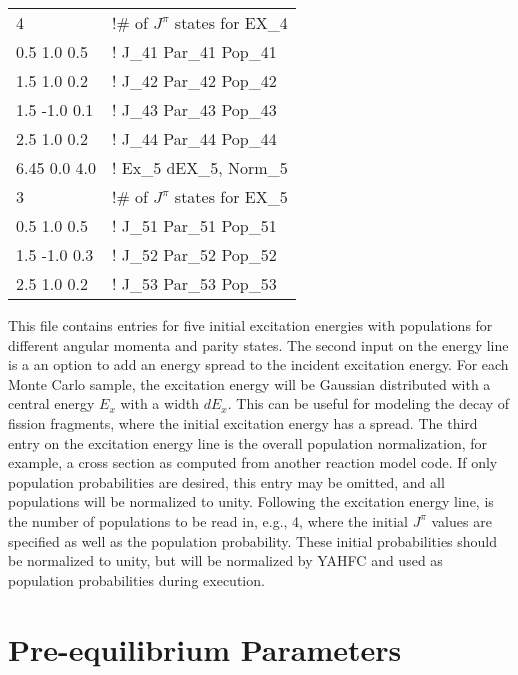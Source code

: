 \documentclass[
10pt,
showpacs,preprintnumbers,footinbib,
amsfonts,amsmath,amssymb,
aps,
prc,twocolumn,groupedaddress,superscriptaddress,
showkeys,
nofootinbib
]{revtex4-1}
\begin{document}
\begin{center}
\begin{tabular}{| p{3 cm} p{5 cm}|}
   4                      &               !\# of $J^\pi$ states for EX\_4\\
  0.5  1.0  0.5      &               ! J\_41  Par\_41 Pop\_41\\
  1.5  1.0  0.2      &               ! J\_42  Par\_42 Pop\_42\\
  1.5  -1.0  0.1      &               ! J\_43  Par\_43 Pop\_43\\
  2.5  1.0  0.2      &               ! J\_44 Par\_44 Pop\_44\\
  6.45  0.0  4.0         &               ! Ex\_5  dEX\_5, Norm\_5\\
   3                      &               !\# of $J^\pi$ states for EX\_5\\
  0.5  1.0  0.5      &               ! J\_51  Par\_51 Pop\_51\\
  1.5  -1.0  0.3      &               ! J\_52  Par\_52 Pop\_52\\
  2.5  1.0  0.2      &               ! J\_53  Par\_53 Pop\_53\\
\hline
\end{tabular}
\end{center}
This file contains entries for five initial excitation energies with populations for different angular momenta and parity states. The second input on the energy line is a an option to add an energy spread to the incident excitation energy. For each Monte Carlo sample, the excitation energy will be Gaussian distributed with a central energy $E_x$ with a width $dE_x$. This can be useful for modeling the decay of fission fragments, where the initial excitation energy has a spread. The third entry on the excitation energy line is the overall population normalization, for example, a cross section as computed from another reaction model code. If only population probabilities are desired, this entry may be omitted, and all populations will be normalized to unity. Following the excitation energy line, is the number of populations to be read in, e.g., 4, where the initial $J^\pi$ values are specified as well as the population probability. These initial probabilities should be normalized to unity, but will be normalized by YAHFC and used as population probabilities during execution. 

\section{Pre-equilibrium Parameters}
\label{App:Preeq}
\end{document}
